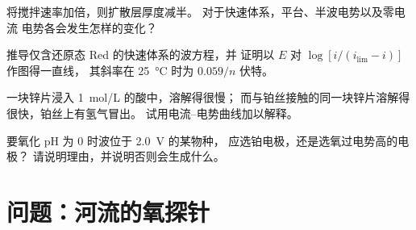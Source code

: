 \begin{exercise}[$\star\star$]\label{exo:b2:current-potential-curves:9}
将搅拌速率加倍，则扩散层厚度减半。
对于快速体系，平台、半波电势以及零电流
电势各会发生怎样的变化？
\end{exercise}

\begin{exercise}[$\star\star\star$]\label{exo:b2:current-potential-curves:10}
推导仅含还原态 Red 的快速体系的波方程，并
证明以 $E$ 对 $\log[i/(i_{\lim} - i)]$ 作图得一直线，
其斜率在 \qty{25}{\degreeCelsius} 时为 $0.059/n$ 伏特。
\end{exercise}

\begin{exercise}[$\star\star\star$]\label{exo:b2:current-potential-curves:11}
一块锌片浸入 \qty{1}{mol/L} 的酸中，溶解得很慢；
而与铂丝接触的同一块锌片溶解得很快，铂丝上有氢气冒出。
试用电流–电势曲线加以解释。
\end{exercise}

\begin{exercise}[$\star\star\star$]\label{exo:b2:current-potential-curves:12}
要氧化 pH 为 0 时波位于 \qty{2.0}{V} 的某物种，
应选铂电极，还是选氧过电势高的电极？
请说明理由，并说明否则会生成什么。
\end{exercise}

\section{问题：河流的氧探针}

